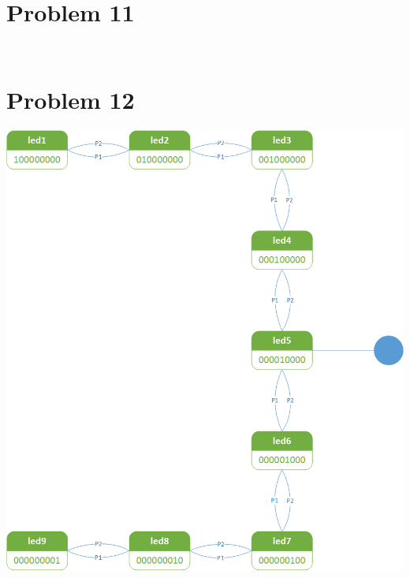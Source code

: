 \documentclass[paper=a4, fontsize=11pt]{scrartcl} %
\numberwithin{equation}{section} %
\numberwithin{figure}{section} %
\numberwithin{table}{section} %
\begin{document}

\section{Problem 11}
\inputminted{vhdl}{src/p11/p11-in.vhd}
\inputminted{vhdl}{src/p11/p11-out.vhd}


\section{Problem 12}
\center\includegraphics[]{p12.png}\\
\inputminted{vhdl}{src/p12/p12.vhd}
\inputminted{vhdl}{src/p12/p12_t.vhd}
\end{document}
